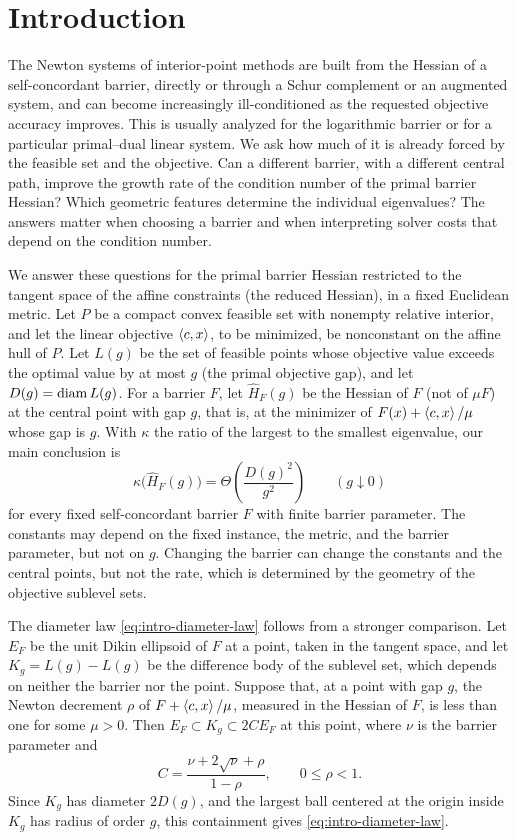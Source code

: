 \section{Introduction}
\label{sec:introduction}

The Newton systems of interior-point methods are built from the
Hessian of a self-concordant barrier, directly or through a Schur
complement or an augmented system, and can become increasingly
ill-conditioned as the requested objective accuracy improves. This is
usually analyzed for the
logarithmic barrier or for a particular primal--dual linear system. We
ask how much of it is already forced by the feasible set and the
objective. Can a different barrier, with a different central path,
improve the growth rate of the condition number of the primal barrier
Hessian? Which geometric features determine the
individual eigenvalues? The answers matter when choosing a barrier and
when interpreting solver costs that depend on the condition number.

We answer these questions for the primal barrier Hessian restricted to
the tangent space of the affine constraints (the reduced Hessian), in a
fixed Euclidean metric. Let $P$ be a compact convex feasible set with
nonempty relative interior, and let the linear objective
$\left\langle c,x\right\rangle$, to be minimized, be nonconstant on the affine hull of
$P$. Let $L(g)$ be the set of feasible points whose objective value
exceeds the optimal value by at most $g$ (the primal objective gap), and let $D(g)=\operatorname{diam} L(g)$. For a barrier $F$, let
$\widehat H_F(g)$ be the Hessian of $F$ (not of $\mu F$) at the central
point with gap $g$, that is, at the minimizer of
$F(x)+\left\langle c,x\right\rangle/\mu$ whose gap is $g$. With $\kappa$ the ratio of the largest to the smallest eigenvalue,
our main conclusion is
\begin{equation}
 \kappa\bigl(\widehat H_F(g)\bigr)
 =\Theta\!\left(\frac{D(g)^2}{g^2}\right)
 \qquad(g\downarrow0)
 \label{eq:intro-diameter-law}
\end{equation}
for every fixed self-concordant barrier $F$ with finite barrier
parameter. The constants may depend on the fixed instance, the metric,
and the barrier parameter, but not on $g$. Changing the barrier can
change the constants and the central points, but not the rate, which is
determined by the geometry of the objective sublevel sets.

The diameter law \eqref{eq:intro-diameter-law} follows from a stronger
comparison. Let $E_F$ be the unit Dikin ellipsoid of $F$ at a point,
taken in the tangent space, and let $K_g=L(g)-L(g)$ be the difference
body of the sublevel set, which depends on neither the barrier nor the
point. Suppose that, at a point
with gap $g$, the Newton decrement $\rho$ of $F+\left\langle c,x\right\rangle/\mu$,
measured in the Hessian of $F$, is less than one for some $\mu>0$. Then
$E_F\subset K_g\subset2CE_F$ at this point, where $\nu$ is the barrier
parameter and
\[
 C=\frac{\nu+2\sqrt\nu+\rho}{1-\rho},\qquad 0\leq\rho<1.
\]
Since $K_g$ has diameter $2D(g)$, and the largest ball centered at the
origin inside $K_g$ has radius of order $g$, this containment gives
\eqref{eq:intro-diameter-law}.

